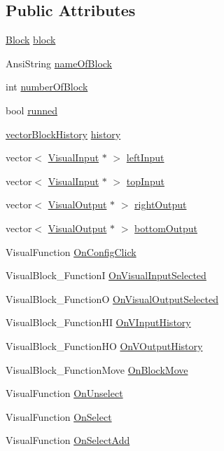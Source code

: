\subsection*{Public Attributes}
\begin{CompactItemize}
\item 
\hyperlink{classBlock}{Block} \hyperlink{classVisualBlock_76bfcfa68286004c352c4736635be0cb}{block}
\item 
AnsiString \hyperlink{classVisualBlock_08efb43e1546631cb54848002d809a23}{nameOfBlock}
\item 
int \hyperlink{classVisualBlock_726797ae619bdd874806321c7b878607}{numberOfBlock}
\item 
bool \hyperlink{classVisualBlock_3bc0c90322c4b39a85de000a2d036413}{runned}
\item 
\hyperlink{BlockHistory_8h_1e80e0966c4a2e68a83338258a89f5ae}{vectorBlockHistory} \hyperlink{classVisualBlock_bae4197cd71315bf74e26e9e7f04bc8c}{history}
\item 
vector$<$ \hyperlink{classVisualInput}{VisualInput} $\ast$ $>$ \hyperlink{classVisualBlock_8f4a1e25447f63dd82fef4ca1b5fa036}{leftInput}
\item 
vector$<$ \hyperlink{classVisualInput}{VisualInput} $\ast$ $>$ \hyperlink{classVisualBlock_ea0803cef47e1cd7f3c3fd92268b2d5c}{topInput}
\item 
vector$<$ \hyperlink{classVisualOutput}{VisualOutput} $\ast$ $>$ \hyperlink{classVisualBlock_e87bdb704a2ac4af6bc51b34456fdd1d}{rightOutput}
\item 
vector$<$ \hyperlink{classVisualOutput}{VisualOutput} $\ast$ $>$ \hyperlink{classVisualBlock_c20150edf6b145056e52ef811d3e977a}{bottomOutput}
\item 
VisualFunction \hyperlink{classVisualBlock_b342e90eddc48bc614d0a9da48f0e7e4}{OnConfigClick}
\item 
VisualBlock\_\-FunctionI \hyperlink{classVisualBlock_8fc6c9338da4af652d7d1fe170754f7b}{OnVisualInputSelected}
\item 
VisualBlock\_\-FunctionO \hyperlink{classVisualBlock_2c6a85164bf488a2b1055be8331aa813}{OnVisualOutputSelected}
\item 
VisualBlock\_\-FunctionHI \hyperlink{classVisualBlock_aa5ecd1d9c57caa0a9b08ece183dc9da}{OnVInputHistory}
\item 
VisualBlock\_\-FunctionHO \hyperlink{classVisualBlock_9a624de525f52a202cd57062f42332f3}{OnVOutputHistory}
\item 
VisualBlock\_\-FunctionMove \hyperlink{classVisualBlock_a01dc407b0ccc5d72e4ba2b3cc67bbc0}{OnBlockMove}
\item 
VisualFunction \hyperlink{classVisualBlock_10238a1e11bc16de548c0e0ae7118ccf}{OnUnselect}
\item 
VisualFunction \hyperlink{classVisualBlock_425f00a0257fc0f25e01b8e4eb24f3f7}{OnSelect}
\item 
VisualFunction \hyperlink{classVisualBlock_9398455ed1a288276ddc1845cd409d9f}{OnSelectAdd}
\end{CompactItemize}
